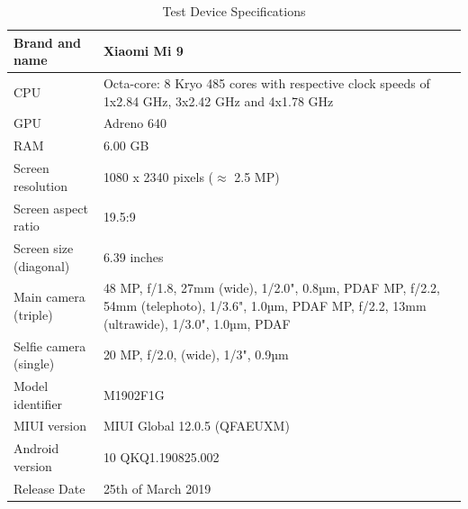 \documentclass[
			   fontsize=11pt,
               paper=a4,
               bibliography=totoc,
               idxtotoc,
               headsepline,
               footsepline,
               footinclude=false,
               BCOR=12mm,
               DIV=13,
               openany,   %
               ]
               {scrbook}
\begin{document}
\begin{table}[h]
	\begin{tabularx}{\columnwidth}
		{ >{\RaggedRight}p{4cm} | L }
		\hline
		Brand and name	&	Xiaomi Mi 9	\\	\hline
		CPU	&	Octa-core: 8 Kryo 485 cores with respective clock speeds of 1x2.84 GHz, 3x2.42 GHz and 4x1.78 GHz	\\	\hline
		GPU	&	Adreno 640	\\	\hline
		RAM	&	6.00 GB	\\	\hline
		Screen resolution	&	1080 x 2340 pixels ($\approx$ 2.5 MP)	\\	\hline
		Screen aspect ratio	&	19.5:9 \\ \hline
		Screen size (diagonal)	&	6.39 inches	\\	\hline
		Main camera (triple)	&	48 MP, f/1.8, 27mm (wide), 1/2.0", 0.8µm, PDAF  MP, f/2.2, 54mm (telephoto), 1/3.6", 1.0µm, PDAF  MP, f/2.2, 13mm (ultrawide), 1/3.0", 1.0µm, PDAF	\\	\hline
		Selfie camera (single)	& 20 MP, f/2.0, (wide), 1/3", 0.9µm \\ \hline
		Model identifier	&	M1902F1G	\\	\hline
		MIUI version	&	MIUI Global 12.0.5 (QFAEUXM)	\\	\hline
		Android version	&	10 QKQ1.190825.002	\\	\hline
		Release Date	&	25th of March 2019	\\	\hline
	\end{tabularx}
	\caption[Test Device Specifications]{Test Device Specifications}
	\label{tab:specs}
\end{table}


\listoffigures

\listoftables

\printbibliography

\printglossary[type=acronym,nonumberlist]

\printglossary[type=main,nonumberlist]
\end{document}
